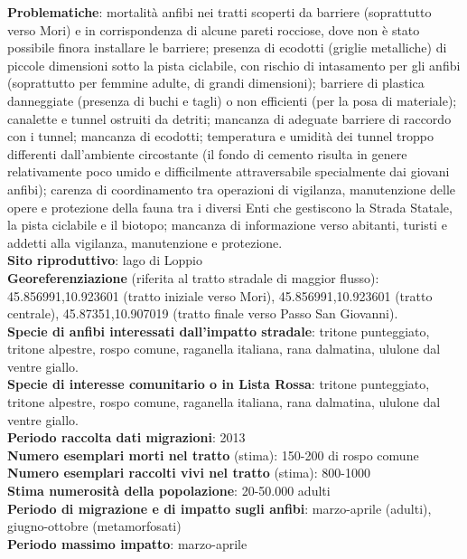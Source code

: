 \documentclass[11pt,a4paper,twoside]{memoir}
\begin{document}
\textbf{Problematiche}: mortalità anfibi nei tratti scoperti da barriere (soprattutto verso Mori) e in corrispondenza di alcune pareti rocciose, dove non è stato possibile finora installare le barriere; presenza di ecodotti (griglie metalliche) di piccole dimensioni sotto la pista ciclabile, con rischio di intasamento per gli anfibi (soprattutto per femmine adulte, di grandi dimensioni); barriere di plastica danneggiate (presenza di buchi e tagli) o non efficienti (per la posa di materiale); canalette e tunnel ostruiti da detriti; mancanza di adeguate barriere di raccordo con i tunnel; mancanza di ecodotti; temperatura e umidità dei tunnel troppo differenti dall'ambiente circostante (il fondo di cemento risulta in genere relativamente poco umido e difficilmente attraversabile specialmente dai giovani anfibi); carenza di coordinamento tra operazioni di vigilanza, manutenzione delle opere e protezione della fauna tra i diversi Enti che gestiscono la Strada Statale, la pista ciclabile e il biotopo; mancanza di informazione verso abitanti, turisti e addetti alla vigilanza, manutenzione e protezione. \\
\textbf{Sito riproduttivo}: lago di Loppio \\
\textbf{Georeferenziazione} (riferita al tratto stradale di maggior flusso): 45.856991,10.923601 (tratto iniziale verso Mori), 45.856991,10.923601 (tratto centrale), 45.87351,10.907019 (tratto finale verso Passo San Giovanni). \\
\textbf{Specie di anfibi interessati dall’impatto stradale}: tritone punteggiato, tritone alpestre, rospo comune, raganella italiana, rana dalmatina, ululone dal ventre giallo. \\
\textbf{Specie di interesse comunitario o in Lista Rossa}: tritone punteggiato, tritone alpestre, rospo comune, raganella italiana, rana dalmatina, ululone dal ventre giallo. \\
\textbf{Periodo raccolta dati migrazioni}: 2013 \\
\textbf{Numero esemplari morti nel tratto} (stima): 150-200 di rospo comune \\
\textbf{Numero esemplari raccolti vivi nel tratto} (stima): 800-1000 \\
\textbf{Stima numerosità della popolazione}: 20-50.000 adulti \\
\textbf{Periodo di migrazione e di impatto sugli anfibi}: marzo-aprile (adulti), giugno-ottobre (metamorfosati) \\
\textbf{Periodo massimo impatto}: marzo-aprile \\
\end{document}
